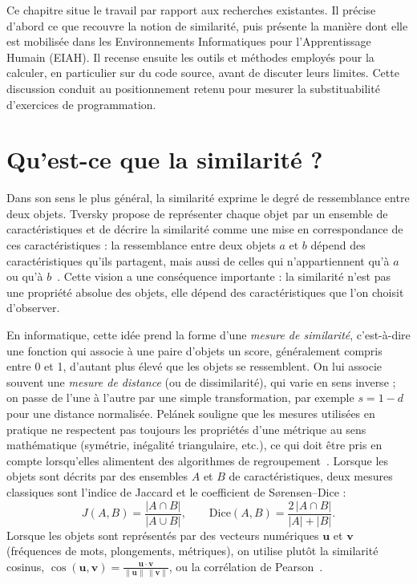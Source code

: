 Ce chapitre situe le travail par rapport aux recherches existantes. Il précise d'abord ce que recouvre la notion de similarité, puis présente la manière dont elle est mobilisée dans les Environnements Informatiques pour l'Apprentissage Humain (EIAH). Il recense ensuite les outils et méthodes employés pour la calculer, en particulier sur du code source, avant de discuter leurs limites. Cette discussion conduit au positionnement retenu pour mesurer la substituabilité d'exercices de programmation.

\section{Qu'est-ce que la similarité ?}
\label{sec:similarite}

Dans son sens le plus général, la similarité exprime le degré de ressemblance entre deux objets. Tversky propose de représenter chaque objet par un ensemble de caractéristiques et de décrire la similarité comme une mise en correspondance de ces caractéristiques : la ressemblance entre deux objets $a$ et $b$ dépend des caractéristiques qu'ils partagent, mais aussi de celles qui n'appartiennent qu'à $a$ ou qu'à $b$~\cite{tversky1977}. Cette vision a une conséquence importante : la similarité n'est pas une propriété absolue des objets, elle dépend des caractéristiques que l'on choisit d'observer.

En informatique, cette idée prend la forme d'une \emph{mesure de similarité}, c'est-à-dire une fonction qui associe à une paire d'objets un score, généralement compris entre 0 et 1, d'autant plus élevé que les objets se ressemblent. On lui associe souvent une \emph{mesure de distance} (ou de dissimilarité), qui varie en sens inverse ; on passe de l'une à l'autre par une simple transformation, par exemple $s = 1 - d$ pour une distance normalisée. Pelánek souligne que les mesures utilisées en pratique ne respectent pas toujours les propriétés d'une métrique au sens mathématique (symétrie, inégalité triangulaire, etc.), ce qui doit être pris en compte lorsqu'elles alimentent des algorithmes de regroupement~\cite{pelanek2020overview}. Lorsque les objets sont décrits par des ensembles $A$ et $B$ de caractéristiques, deux mesures classiques sont l'indice de Jaccard et le coefficient de Sørensen--Dice :
\begin{equation}
  J(A,B) = \frac{|A \cap B|}{|A \cup B|},
  \qquad
  \mathrm{Dice}(A,B) = \frac{2\,|A \cap B|}{|A| + |B|}.
\end{equation}
Lorsque les objets sont représentés par des vecteurs numériques $\mathbf{u}$ et $\mathbf{v}$ (fréquences de mots, plongements, métriques), on utilise plutôt la similarité cosinus, $\cos(\mathbf{u},\mathbf{v}) = \frac{\mathbf{u}\cdot\mathbf{v}}{\|\mathbf{u}\|\,\|\mathbf{v}\|}$, ou la corrélation de Pearson~\cite{pelanek2018programming}.

